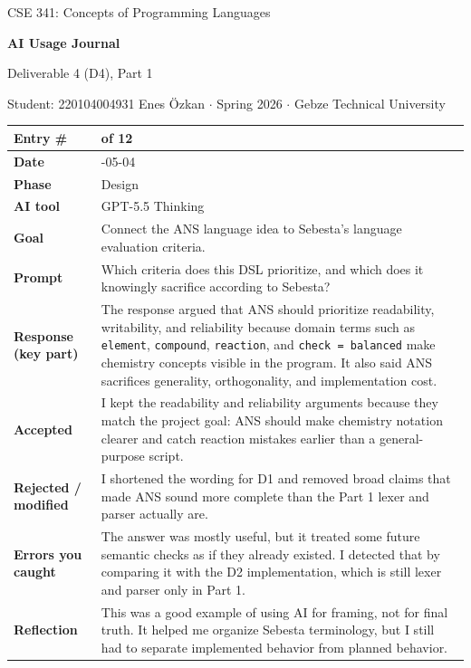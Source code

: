 \documentclass[11pt,a4paper]{article}
\newcommand{\code}[1]{\texttt{#1}}
\newcommand{\entrygap}{\vspace{8pt}}
\newenvironment{journalentry}{%
  \begin{center}\small\renewcommand{\arraystretch}{1.22}%
  \begin{tabular}{|>{\columncolor{anscodebg}\bfseries}p{3.0cm}|>{\RaggedRight\arraybackslash}p{12.25cm}|}%
  \hline
}{%
  \end{tabular}\end{center}\entrygap
}
\begin{document}
\begin{center}
  {\footnotesize\color{anscaption}CSE 341: Concepts of Programming Languages\par}
  \vspace{3pt}
  {\huge\bfseries\sffamily AI Usage Journal\par}
  \vspace{4pt}
  {\large Deliverable 4 (D4), Part 1\par}
  \vspace{6pt}
  {\footnotesize\color{anscaption}
    Student: 220104004931 Enes Özkan \(\cdot\)
    Spring 2026 \(\cdot\)
    Gebze Technical University\par}
\end{center}
\vspace{7pt}

\begin{journalentry}
Entry \# & 1 of 12 \\ \hline
Date & 2026-05-04 \\ \hline
Phase & Design \\ \hline
AI tool & GPT-5.5 Thinking \\ \hline
Goal & Connect the ANS language idea to Sebesta's language evaluation criteria. \\ \hline
Prompt & Which criteria does this DSL prioritize, and which does it knowingly sacrifice according to Sebesta? \\ \hline
Response (key part) & The response argued that ANS should prioritize readability, writability, and reliability because domain terms such as \code{element}, \code{compound}, \code{reaction}, and \code{check = balanced} make chemistry concepts visible in the program. It also said ANS sacrifices generality, orthogonality, and implementation cost. \\ \hline
Accepted & I kept the readability and reliability arguments because they match the project goal: ANS should make chemistry notation clearer and catch reaction mistakes earlier than a general-purpose script. \\ \hline
Rejected / modified & I shortened the wording for D1 and removed broad claims that made ANS sound more complete than the Part 1 lexer and parser actually are. \\ \hline
Errors you caught & The answer was mostly useful, but it treated some future semantic checks as if they already existed. I detected that by comparing it with the D2 implementation, which is still lexer and parser only in Part 1. \\ \hline
Reflection & This was a good example of using AI for framing, not for final truth. It helped me organize Sebesta terminology, but I still had to separate implemented behavior from planned behavior. \\ \hline
\end{journalentry}
\end{document}
